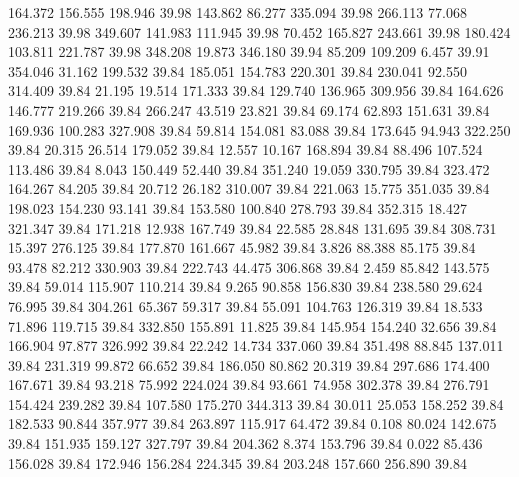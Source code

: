  164.372  156.555  198.946        39.98
 143.862   86.277  335.094        39.98
 266.113   77.068  236.213        39.98
 349.607  141.983  111.945        39.98
  70.452  165.827  243.661        39.98
 180.424  103.811  221.787        39.98
 348.208   19.873  346.180        39.94
  85.209  109.209    6.457        39.91
 354.046   31.162  199.532        39.84
 185.051  154.783  220.301        39.84
 230.041   92.550  314.409        39.84
  21.195   19.514  171.333        39.84
 129.740  136.965  309.956        39.84
 164.626  146.777  219.266        39.84
 266.247   43.519   23.821        39.84
  69.174   62.893  151.631        39.84
 169.936  100.283  327.908        39.84
  59.814  154.081   83.088        39.84
 173.645   94.943  322.250        39.84
  20.315   26.514  179.052        39.84
  12.557   10.167  168.894        39.84
  88.496  107.524  113.486        39.84
   8.043  150.449   52.440        39.84
 351.240   19.059  330.795        39.84
 323.472  164.267   84.205        39.84
  20.712   26.182  310.007        39.84
 221.063   15.775  351.035        39.84
 198.023  154.230   93.141        39.84
 153.580  100.840  278.793        39.84
 352.315   18.427  321.347        39.84
 171.218   12.938  167.749        39.84
  22.585   28.848  131.695        39.84
 308.731   15.397  276.125        39.84
 177.870  161.667   45.982        39.84
   3.826   88.388   85.175        39.84
  93.478   82.212  330.903        39.84
 222.743   44.475  306.868        39.84
   2.459   85.842  143.575        39.84
  59.014  115.907  110.214        39.84
   9.265   90.858  156.830        39.84
 238.580   29.624   76.995        39.84
 304.261   65.367   59.317        39.84
  55.091  104.763  126.319        39.84
  18.533   71.896  119.715        39.84
 332.850  155.891   11.825        39.84
 145.954  154.240   32.656        39.84
 166.904   97.877  326.992        39.84
  22.242   14.734  337.060        39.84
 351.498   88.845  137.011        39.84
 231.319   99.872   66.652        39.84
 186.050   80.862   20.319        39.84
 297.686  174.400  167.671        39.84
  93.218   75.992  224.024        39.84
  93.661   74.958  302.378        39.84
 276.791  154.424  239.282        39.84
 107.580  175.270  344.313        39.84
  30.011   25.053  158.252        39.84
 182.533   90.844  357.977        39.84
 263.897  115.917   64.472        39.84
   0.108   80.024  142.675        39.84
 151.935  159.127  327.797        39.84
 204.362    8.374  153.796        39.84
   0.022   85.436  156.028        39.84
 172.946  156.284  224.345        39.84
 203.248  157.660  256.890        39.84
